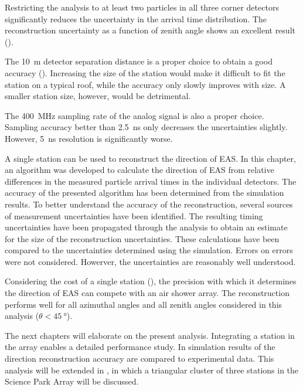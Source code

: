 Restricting the analysis to at least two particles in all three corner detectors
significantly reduces the uncertainty in the arrival time distribution.  The
reconstruction uncertainty as a function of zenith angle shows an excellent
result ().

The \SI{10}{\meter} detector
separation distance is a proper choice to obtain a good accuracy
().
Increasing the size of the station would make it difficult to fit the station on
a typical roof, while the accuracy only slowly improves with size.
A smaller station size, however, would be detrimental.

The \SI{400}{\mega\hertz} sampling rate of the analog signal is also a proper
choice.  Sampling accuracy better than \SI{2.5}{\nano\second} only decreases the
uncertainties slightly.  However, \SI{5}{\nano\second} resolution is
significantly worse.

A single \hisparc station can be used to reconstruct the direction of EAS.
In this chapter, an algorithm was developed to calculate the direction of
EAS from relative differences in the measured particle arrival times in
the individual detectors.  The accuracy of the presented algorithm has
been determined from the simulation results.  To better understand the
accuracy of the reconstruction, several sources of measurement
uncertainties have been identified.  The resulting timing uncertainties
have been propagated through the analysis to obtain an estimate for the
size of the reconstruction uncertainties.  These calculations have been
compared to the uncertainties determined using the simulation.  Errors on
errors were not considered.  Howerver, the uncertainties are reasonably
well understood.  

Considering the cost of a single \hisparc station (), the
precision with which it determines the direction of EAS can compete with
an air shower array.  The reconstruction performs well for all azimuthal
angles and all zenith angles considered in this analysis ($\theta <
\SI{45}{\degree}$).

The next chapters will elaborate on the present analysis.  Integrating a
\hisparc station in the \kascade array enables a detailed performance study.
In  simulation results of the direction reconstruction
accuracy are compared to experimental data. This analysis will be
extended in , in which a triangular cluster of three
stations in the Science Park Array will be discussed.
